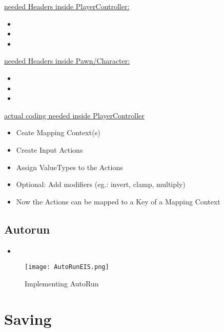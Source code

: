     \uline{needed Headers inside PlayerController:}
    \begin{itemize}
        \item {}
        \item {}
        \item {}
    \end{itemize}
        
    \uline{needed Headers inside Pawn/Character:}
    \begin{itemize}
        \item {}
        \item {}
        \item {}
    \end{itemize}

    \uline{actual coding needed inside PlayerController}
    \begin{itemize}
        \item Ceate Mapping Context(s)
        \item Create Input Actions
        \item Assign ValueTypes to the Actions
        \item Optional: Add modifiers (eg.: invert, clamp, multiply)
        \item Now the Actions can be mapped to a Key of a Mapping Context
    \end{itemize}


    \subsection{Autorun}
        \begin{itemize}
            \item 
        \end{itemize}

        \begin{figure}[H]
            \texttt{[image: AutoRunEIS.png]}
            \caption{Implementing AutoRun}
            \label{}
        \end{figure}


\section{Saving}

